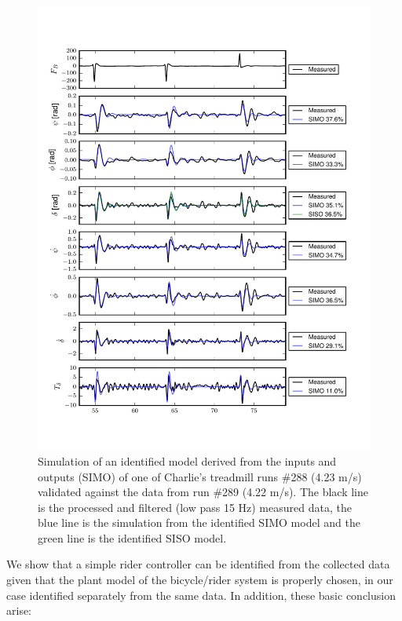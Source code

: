 \documentclass{article}
\begin{document}
\begin{figure}
  \centering
  \includegraphics[width=5.0in]{rider-id-treadmill-run.pdf}
  \caption{Simulation of an identified model derived from the inputs and
  outputs (SIMO) of one of Charlie's treadmill runs \#288 (4.23 m/s) validated
  against the data from run \#289 (4.22 m/s). The black line is the processed
  and filtered (low pass 15 Hz) measured data, the blue line is the simulation
  from the identified SIMO model and the green line is the identified SISO
  model.}
  \label{fig}
\end{figure}

We show that a simple rider controller can be identified from the collected
data given that the plant model of the bicycle/rider system is properly chosen,
in our case identified separately from the same data. In addition, these basic
conclusion arise:
\end{document}
